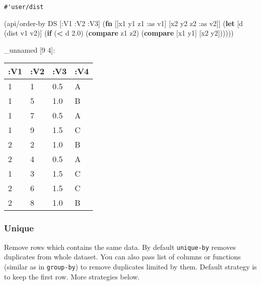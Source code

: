 \documentclass[]{article}
\newenvironment{Shaded}{\begin{snugshade}}{\end{snugshade}}
\newcommand{\AttributeTok}[1]{\textcolor[rgb]{0.77,0.63,0.00}{#1}}
\newcommand{\BuiltInTok}[1]{#1}
\newcommand{\FloatTok}[1]{\textcolor[rgb]{0.00,0.00,0.81}{#1}}
\newcommand{\FunctionTok}[1]{\textcolor[rgb]{0.00,0.00,0.00}{#1}}
\newcommand{\KeywordTok}[1]{\textcolor[rgb]{0.13,0.29,0.53}{\textbf{#1}}}
\newcommand{\NormalTok}[1]{#1}
\newcommand{\VariableTok}[1]{\textcolor[rgb]{0.00,0.00,0.00}{#1}}
\begin{document}
\begin{Shaded}
\end{Shaded}

\begin{verbatim}
#'user/dist
\end{verbatim}

\begin{Shaded}
\begin{Highlighting}[]
\NormalTok{(api/order-by DS [}\AttributeTok{:V1} \AttributeTok{:V2} \AttributeTok{:V3}\NormalTok{] (}\KeywordTok{fn}\NormalTok{ [[x1 y1 z1 }\AttributeTok{:as}\NormalTok{ v1] [x2 y2 z2 }\AttributeTok{:as}\NormalTok{ v2]]}
\NormalTok{                                 (}\KeywordTok{let}\NormalTok{ [d (dist v1 v2)]}
\NormalTok{                                   (}\KeywordTok{if}\NormalTok{ (}\KeywordTok{<}\NormalTok{ d }\FloatTok{2.0}\NormalTok{)}
\NormalTok{                                     (}\KeywordTok{compare}\NormalTok{ z1 z2)}
\NormalTok{                                     (}\KeywordTok{compare}\NormalTok{ [x1 y1] [x2 y2])))))}
\end{Highlighting}
\end{Shaded}

\_unnamed {[}9 4{]}:

\begin{longtable}[]{@{}llll@{}}
\toprule
:V1 & :V2 & :V3 & :V4\tabularnewline
\midrule
\endhead
1 & 1 & 0.5 & A\tabularnewline
1 & 5 & 1.0 & B\tabularnewline
1 & 7 & 0.5 & A\tabularnewline
1 & 9 & 1.5 & C\tabularnewline
2 & 2 & 1.0 & B\tabularnewline
2 & 4 & 0.5 & A\tabularnewline
1 & 3 & 1.5 & C\tabularnewline
2 & 6 & 1.5 & C\tabularnewline
2 & 8 & 1.0 & B\tabularnewline
\bottomrule
\end{longtable}

\hypertarget{unique}{%
\subsubsection{Unique}\label{unique}}

Remove rows which contains the same data. By default \texttt{unique-by}
removes duplicates from whole dataset. You can also pass list of columns
or functions (similar as in \texttt{group-by}) to remove duplicates
limited by them. Default strategy is to keep the first row. More
strategies below.
\end{document}
